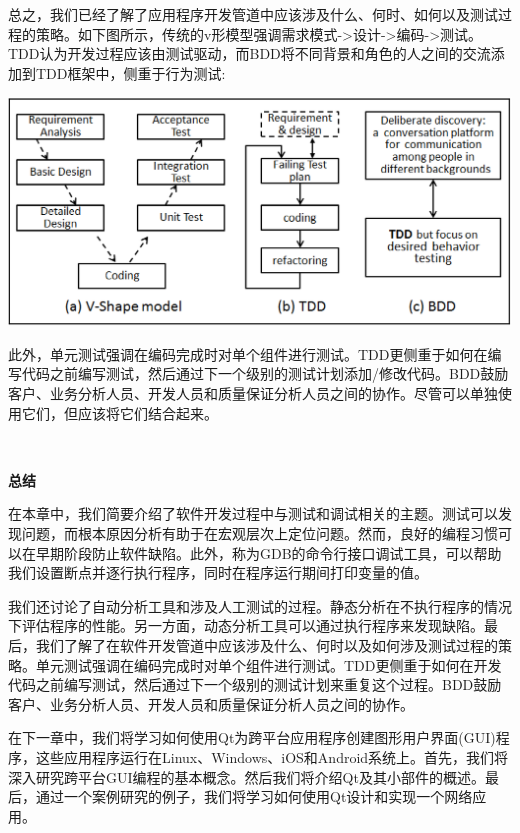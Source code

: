 总之，我们已经了解了应用程序开发管道中应该涉及什么、何时、如何以及测试过程的策略。如下图所示，传统的v形模型强调需求模式->设计->编码->测试。TDD认为开发过程应该由测试驱动，而BDD将不同背景和角色的人之间的交流添加到TDD框架中，侧重于行为测试: \par

\begin{center}
	\includegraphics[width=1.0\textwidth]{content/Section-2/Chapter-13/3}
\end{center}

此外，单元测试强调在编码完成时对单个组件进行测试。TDD更侧重于如何在编写代码之前编写测试，然后通过下一个级别的测试计划添加/修改代码。BDD鼓励客户、业务分析人员、开发人员和质量保证分析人员之间的协作。尽管可以单独使用它们，但应该将它们结合起来。 \par

\noindent\textbf{}\ \par
\textbf{总结} \ \par
在本章中，我们简要介绍了软件开发过程中与测试和调试相关的主题。测试可以发现问题，而根本原因分析有助于在宏观层次上定位问题。然而，良好的编程习惯可以在早期阶段防止软件缺陷。此外，称为GDB的命令行接口调试工具，可以帮助我们设置断点并逐行执行程序，同时在程序运行期间打印变量的值。 \par
我们还讨论了自动分析工具和涉及人工测试的过程。静态分析在不执行程序的情况下评估程序的性能。另一方面，动态分析工具可以通过执行程序来发现缺陷。最后，我们了解了在软件开发管道中应该涉及什么、何时以及如何涉及测试过程的策略。单元测试强调在编码完成时对单个组件进行测试。TDD更侧重于如何在开发代码之前编写测试，然后通过下一个级别的测试计划来重复这个过程。BDD鼓励客户、业务分析人员、开发人员和质量保证分析人员之间的协作。 \par
在下一章中，我们将学习如何使用Qt为跨平台应用程序创建图形用户界面(GUI)程序，这些应用程序运行在Linux、Windows、iOS和Android系统上。首先，我们将深入研究跨平台GUI编程的基本概念。然后我们将介绍Qt及其小部件的概述。最后，通过一个案例研究的例子，我们将学习如何使用Qt设计和实现一个网络应用。 \par

